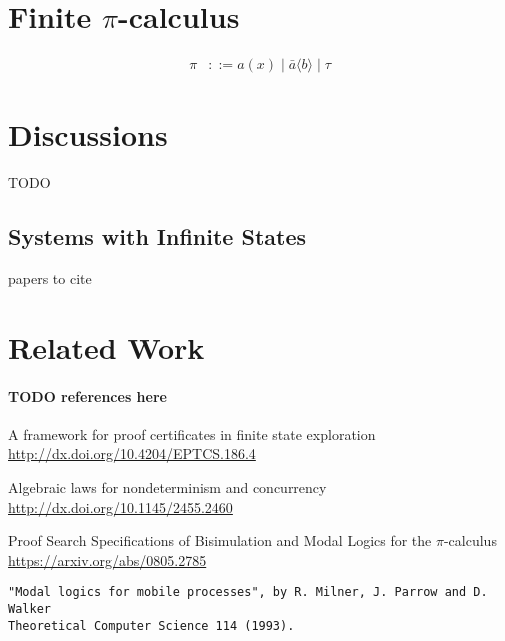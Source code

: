 \documentclass{llncs}
\begin{document}
\section{Finite $\pi$-calculus}\label{sec:pic}
\begin{align*}
\pi &::= a(x) \mid \bar a\langle b \rangle  \mid\tau
\end{align*}

\section{Discussions}
TODO
\subsection{Systems with Infinite States}
papers to cite


\section{Related Work}


\paragraph{TODO references here}
A framework for proof certificates in finite state exploration\\
\url{http://dx.doi.org/10.4204/EPTCS.186.4}

Algebraic laws for nondeterminism and concurrency\\
\url{http://dx.doi.org/10.1145/2455.2460}

Proof Search Specifications of Bisimulation and Modal Logics for the $\pi$-calculus\\
\url{https://arxiv.org/abs/0805.2785}

\begin{verbatim}
"Modal logics for mobile processes", by R. Milner, J. Parrow and D. Walker
Theoretical Computer Science 114 (1993).
\end{verbatim}
\end{document}

